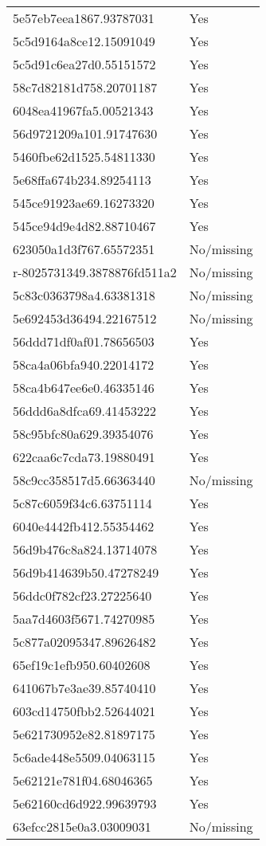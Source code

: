 \begin{tabular}{ll}
5e57eb7eea1867.93787031 & Yes \\
5c5d9164a8ce12.15091049 & Yes \\
5c5d91c6ea27d0.55151572 & Yes \\
58c7d82181d758.20701187 & Yes \\
6048ea41967fa5.00521343 & Yes \\
56d9721209a101.91747630 & Yes \\
5460fbe62d1525.54811330 & Yes \\
5e68ffa674b234.89254113 & Yes \\
545ce91923ae69.16273320 & Yes \\
545ce94d9e4d82.88710467 & Yes \\
623050a1d3f767.65572351 & No/missing \\
r-8025731349.3878876fd511a2 & No/missing \\
5c83c0363798a4.63381318 & No/missing \\
5e692453d36494.22167512 & No/missing \\
56ddd71df0af01.78656503 & Yes \\
58ca4a06bfa940.22014172 & Yes \\
58ca4b647ee6e0.46335146 & Yes \\
56ddd6a8dfca69.41453222 & Yes \\
58c95bfc80a629.39354076 & Yes \\
622caa6c7cda73.19880491 & Yes \\
58c9cc358517d5.66363440 & No/missing \\
5c87c6059f34c6.63751114 & Yes \\
6040e4442fb412.55354462 & Yes \\
56d9b476c8a824.13714078 & Yes \\
56d9b414639b50.47278249 & Yes \\
56ddc0f782cf23.27225640 & Yes \\
5aa7d4603f5671.74270985 & Yes \\
5c877a02095347.89626482 & Yes \\
65ef19c1efb950.60402608 & Yes \\
641067b7e3ae39.85740410 & Yes \\
603cd14750fbb2.52644021 & Yes \\
5e621730952e82.81897175 & Yes \\
5c6ade448e5509.04063115 & Yes \\
5e62121e781f04.68046365 & Yes \\
5e62160cd6d922.99639793 & Yes \\
63efcc2815e0a3.03009031 & No/missing \\

\end{tabular}

